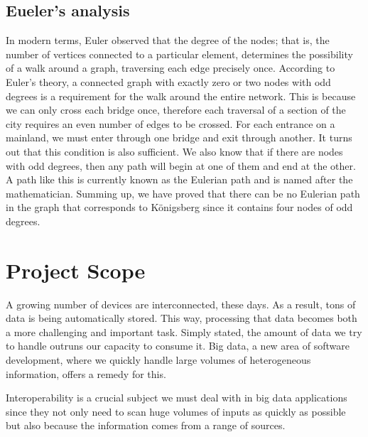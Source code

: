\subsection{Eueler's analysis}

In modern terms, Euler observed that the degree of the nodes; that is, the number of vertices connected to a particular element, determines the possibility of a walk around a graph, traversing each edge precisely once. According to Euler's theory, a connected graph with exactly zero or two nodes with odd degrees is a requirement for the walk around the entire network. This is because we can only cross each bridge once, therefore each traversal of a section of the city requires an even number of edges to be crossed. For each entrance on a mainland, we must enter through one bridge and exit through another. It turns out that this condition is also sufficient. We also know that if there are nodes with odd degrees, then any path will begin at one of them and end at the other. A path like this is currently known as the Eulerian path and is named after the mathematician. Summing up, we have proved that there can be no Eulerian path in the graph that corresponds to Königsberg since it contains four nodes of odd degrees.

\section{Project Scope}

A growing number of devices are interconnected, these days. As a result, tons of data is being automatically stored. This way, processing that data becomes both a more challenging and important task. Simply stated, the amount of data we try to handle outruns our capacity to consume it. Big data, a new area of software development, where we quickly handle large volumes of heterogeneous information, offers a remedy for this.

Interoperability is a crucial subject we must deal with in big data applications since they not only need to scan huge volumes of inputs as quickly as possible but also because the information comes from a range of sources.


